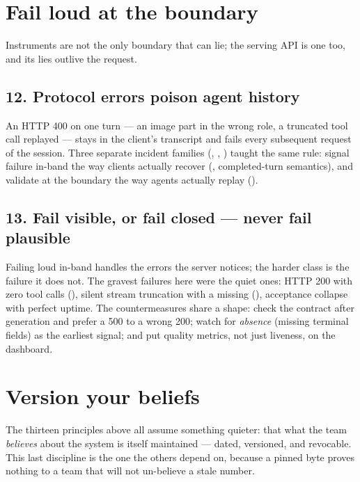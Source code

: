 \section{Fail loud at the boundary}

Instruments are not the only boundary that can lie; the serving API is one
too, and its lies outlive the request.

\subsection*{12. Protocol errors poison agent history}
An HTTP 400 on one turn --- an image part in the wrong role, a truncated
tool call replayed --- stays in the client's transcript and fails every
subsequent request of the session. Three separate incident families
(, , ) taught the same rule: signal
failure in-band the way clients actually recover (,
completed-turn semantics), and validate at the boundary the way agents
actually replay ().

\subsection*{13. Fail visible, or fail closed --- never fail plausible}
Failing loud in-band handles the errors the server notices; the harder
class is the failure it does not. The gravest failures here were the quiet
ones: HTTP 200 with zero tool calls
(), silent stream truncation with a missing
 (), acceptance collapse with perfect
uptime. The countermeasures share a shape: check the contract after
generation and prefer a 500 to a wrong 200; watch for \emph{absence}
(missing terminal fields) as the earliest signal; and put quality metrics,
not just liveness, on the dashboard.

\section{Version your beliefs}

The thirteen principles above all assume something quieter: that what the
team \emph{believes} about the system is itself maintained --- dated,
versioned, and revocable. This last discipline is the one the others
depend on, because a pinned byte proves nothing to a team that will not
un-believe a stale number.

